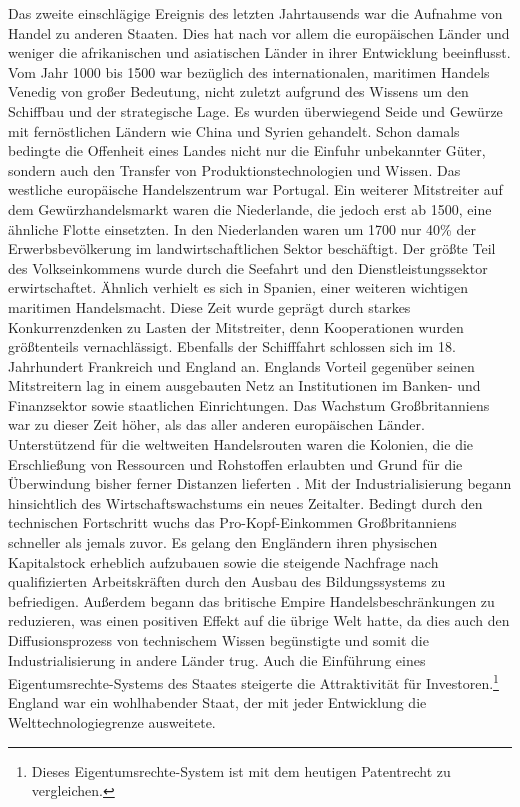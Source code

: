 %
Das zweite einschlägige Ereignis des letzten Jahrtausends war die Aufnahme von Handel zu anderen Staaten. Dies hat nach \cite{Maddison.2001} vor allem die europäischen Länder und weniger die afrikanischen und asiatischen Länder in ihrer Entwicklung  beeinflusst. Vom Jahr 1000 bis 1500 war bezüglich des internationalen, maritimen Handels Venedig von großer Bedeutung, nicht zuletzt aufgrund des Wissens um den Schiffbau und der strategische Lage. Es wurden überwiegend Seide und Gewürze mit fernöstlichen Ländern wie China und Syrien gehandelt. Schon damals bedingte die Offenheit eines Landes nicht nur die Einfuhr unbekannter Güter, sondern auch den Transfer von Produktionstechnologien und Wissen. Das westliche europäische Handelszentrum war Portugal. Ein weiterer Mitstreiter auf dem Gewürzhandelsmarkt waren die Niederlande, die jedoch erst ab 1500, eine ähnliche Flotte einsetzten. In den Niederlanden waren um 1700 nur 40{\%} der Erwerbsbevölkerung im landwirtschaftlichen Sektor beschäftigt. Der größte Teil des Volkseinkommens wurde durch die Seefahrt und den Dienstleistungssektor erwirtschaftet. Ähnlich verhielt es sich in Spanien, einer weiteren wichtigen maritimen Handelsmacht. Diese Zeit wurde geprägt durch starkes Konkurrenzdenken zu Lasten der Mitstreiter, denn Kooperationen wurden größtenteils vernachlässigt. Ebenfalls der Schifffahrt schlossen sich im 18. Jahrhundert Frankreich und England an. Englands Vorteil gegenüber seinen Mitstreitern lag in einem ausgebauten Netz an Institutionen im Banken- und Finanzsektor sowie staatlichen Einrichtungen. Das Wachstum Großbritanniens war zu dieser Zeit höher, als das aller anderen europäischen Länder. Unterstützend für die weltweiten Handelsrouten waren die Kolonien, die  die Erschließung von Ressourcen und Rohstoffen erlaubten und Grund für die Überwindung bisher ferner Distanzen lieferten \cite[S. 20]{Maddison.2001}.
Mit der Industrialisierung begann hinsichtlich des Wirtschaftswachstums ein neues Zeitalter. Bedingt durch den technischen Fortschritt wuchs das Pro-Kopf-Einkommen Großbritanniens schneller als jemals zuvor. Es gelang den Engländern ihren physischen Kapitalstock erheblich aufzubauen sowie die steigende Nachfrage nach qualifizierten Arbeitskräften durch den Ausbau des Bildungssystems zu befriedigen. Außerdem begann das britische Empire Handelsbeschränkungen zu reduzieren, was einen positiven Effekt auf die übrige Welt hatte, da dies auch den Diffusionsprozess von technischem Wissen begünstigte und somit die Industrialisierung in andere Länder trug. Auch die Einführung eines Eigentumsrechte-Systems des Staates steigerte die Attraktivität für Investoren.\footnote{Dieses Eigentumsrechte-System ist mit dem heutigen Patentrecht zu vergleichen.} England war ein wohlhabender Staat, der mit jeder Entwicklung die Welttechnologiegrenze ausweitete. \\
